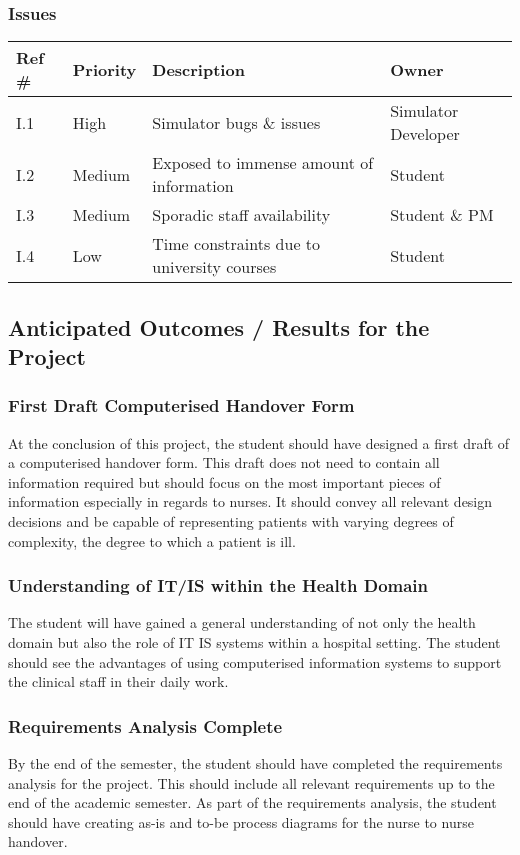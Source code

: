 \subsubsection{Issues}

\begin{tabular}{|l|l|l|l|}
\hline
{\bf Ref \#} & {\bf Priority} & {\bf Description} & {\bf Owner} \\
\hline
I.1 & High & Simulator bugs \& issues & Simulator Developer \\
\hline
I.2 & Medium & Exposed to immense amount of information & Student \\
\hline
I.3 & Medium & Sporadic staff availability  & Student \& PM \\
\hline
I.4 & Low & Time constraints due to university courses & Student \\
\hline
\end{tabular}


\newpage
\subsection{Anticipated Outcomes / Results for the Project}
\subsubsection{First Draft Computerised Handover Form}
At the conclusion of this project, the student should have designed a first draft of a computerised handover form. This draft does not need to contain all information required but should focus on the most important pieces of information especially in regards to nurses. It should convey all relevant design decisions and be capable of representing patients with varying degrees of complexity, the degree to which a patient is ill.

\subsubsection{Understanding of IT/IS within the Health Domain}
The student will have gained a general understanding of not only the health domain but also the role of IT IS systems within a hospital setting. The student should see the advantages of using computerised information systems to support the clinical staff in their daily work.
 
 \subsubsection{Requirements Analysis Complete}
By the end of the semester, the student should have completed the requirements analysis for the project. This should include all relevant requirements up to the end of the academic semester. As part of the requirements analysis, the student should have creating as-is and to-be process diagrams for the nurse to nurse handover.


